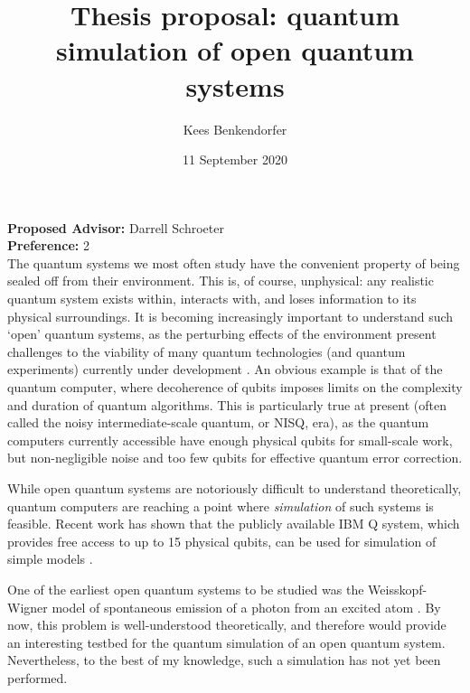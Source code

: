 \documentclass[11pt,twoside,reqno]{amsart}
\title{Thesis proposal: quantum simulation of open quantum systems}
\author{Kees Benkendorfer}
\date{11 September 2020}
\theoremstyle{plain}
\theoremstyle{remark}
\theoremstyle{definition}
\theoremstyle{remark}
\theoremstyle{definition}
\theoremstyle{definition}
\begin{document}
\maketitle

\noindent\textbf{Proposed Advisor:} Darrell Schroeter \\
\noindent\textbf{Preference:} 2 \\

The quantum systems we most often study have the convenient property of being sealed off from their environment. This is, of course, unphysical: any realistic quantum system exists within, interacts with, and loses information to its physical surroundings. It is becoming increasingly important to understand such `open' quantum systems, as the perturbing effects of the environment present challenges to the viability of many quantum technologies (and quantum experiments) currently under development \cite{de_vega_dynamics_2017}. An obvious example is that of the quantum computer, where decoherence of qubits imposes limits on the complexity and duration of quantum algorithms. This is particularly true at present (often called the noisy intermediate-scale quantum, or NISQ, era), as the quantum computers currently accessible have enough physical qubits for small-scale work, but non-negligible noise and too few qubits for effective quantum error correction.

While open quantum systems are notoriously difficult to understand theoretically, quantum computers are reaching a point where \textit{simulation} of such systems is feasible. Recent work has shown that the publicly available IBM Q system, which provides free access to up to 15 physical qubits, can be used for simulation of simple models \cite{garcia-perez_ibm_2020}.

One of the earliest open quantum systems to be studied was the Weisskopf-Wigner model of spontaneous emission of a photon from an excited atom%
. By now, this problem is well-understood theoretically, and therefore would provide an interesting testbed for the quantum simulation of an open quantum system. Nevertheless, to the best of my knowledge, such a simulation has not yet been performed.
\end{document}
